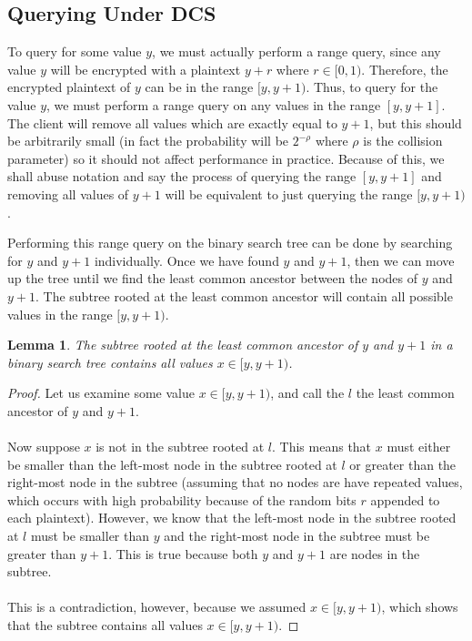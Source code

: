 \documentclass[12pt]{article}
\newtheorem{lemma}{Lemma}
\begin{document}
\subsection{Querying Under DCS}

To query for some value $y$, we must actually perform a range query, since any value $y$ will be encrypted with a plaintext $y + r$ where $r \in [0,1)$. Therefore, the encrypted plaintext of $y$ can be in the range $[y, y + 1)$. Thus, to query for the value $y$, we must perform a range query on any values in the range $[y, y+1]$. The client will remove all values which are exactly equal to $y + 1$, but this should be arbitrarily small (in fact the probability will be $2^{-\rho}$ where $\rho$ is the collision parameter) so it should not affect performance in practice. Because of this, we shall abuse notation and say the process of querying the range $[y, y+1]$ and removing all values of $y+1$ will be equivalent to just querying the range $[y, y+1)$.

Performing this range query on the binary search tree can be done by searching for $y$ and $y+1$ individually. Once we have found $y$ and $y+1$, then we can move up the tree until we find the least common ancestor between the nodes of $y$ and $y+1$. The subtree rooted at the least common ancestor will contain all possible values in the range $[y, y+1)$. \\

  \begin{lemma}
    The subtree rooted at the least common ancestor of $y$ and $y+1$ in a binary search tree contains all values $x \in [y, y+1)$.
  \end{lemma}
  \begin{proof}
Let us examine some value $x \in [y, y+1)$, and call the $l$ the least common ancestor of $y$ and $y+1$. \\ \\
Now suppose $x$ is not in the subtree rooted at $l$. This means that $x$ must either be smaller than the left-most node in the subtree rooted at $l$ or greater than the right-most node in the subtree (assuming that no nodes are have repeated values, which occurs with high probability because of the random bits $r$ appended to each plaintext). However, we know that the left-most node in the subtree rooted at $l$ must be smaller than $y$ and the right-most node in the subtree must be greater than $y+1$. This is true because both $y$ and $y+1$ are nodes in the subtree. \\ \\
This is a contradiction, however, because we assumed $x \in [y, y+1)$, which shows that the subtree contains all values $x \in [y, y+1)$.
\end{proof}
\end{document}
